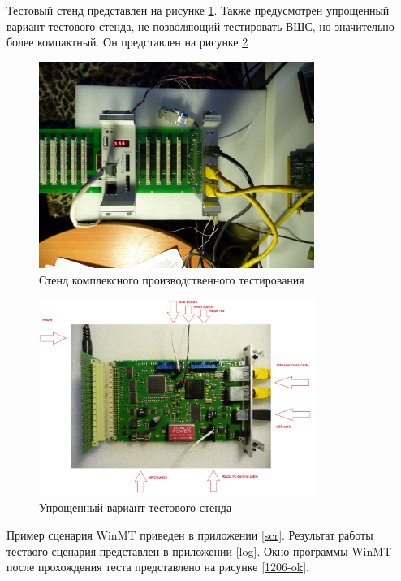 \documentclass[a4paper,14pt,bachelor]{disser}
\begin{document}
Тестовый стенд представлен на рисунке \ref{test-stend}. Также предусмотрен упрощенный вариант тестового стенда, не позволяющий тестировать ВШС, но значительно более компактный. Он представлен на рисунке \ref{stend-alone}

\begin{figure}[H]
\addtocounter{myfigs}{1}
\begin{center}
	\includegraphics[width=0.8\textwidth]{P1030169}
	\caption{\label{test-stend} Стенд комплексного производственного тестирования}
\end{center}
\end{figure}

\begin{figure}[H]
\addtocounter{myfigs}{1}
\begin{center}
	\includegraphics[width=0.8\textwidth]{stand-alone}
	\caption{\label{stend-alone} Упрощенный вариант тестового стенда}
\end{center}
\end{figure}

Пример сценария WinMT приведен в приложении \ref{scr}. Результат работы тествого сценария представлен в приложении \ref{log}. Окно программы WinMT после прохождения теста представлено на рисунке \ref{1206-ok}.
\end{document}

